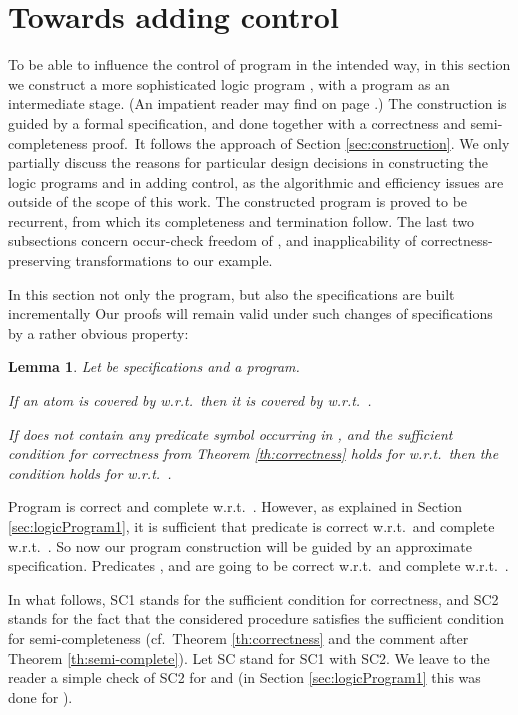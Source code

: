\documentclass{tlp}
\newtheorem{lemma}[theorem]{Lemma}
\begin{document}
\section{Towards adding control}
\label{sec:program}





To be able to influence the control of program  in the intended way,
in this section
we construct a more sophisticated logic program , with a program 
 as an intermediate stage.
(An impatient reader may find
 on page \pageref{final.program}.)
The construction is guided by a formal specification, and done together with
a correctness and semi-completeness proof.\
It follows the approach of Section \ref{sec:construction}.
We only partially discuss the reasons for particular design decisions in
constructing the logic programs
  and in adding control, as the algorithmic and efficiency
  issues are outside of the scope of this work.
The constructed program is proved to be recurrent, from which its
completeness and termination follow.
The last two subsections concern occur-check freedom of ,
and inapplicability of correctness-preserving transformations to our example. 




In this section not only the program, but also the specifications
are built incrementally
Our proofs will
remain valid under such changes of specifications by a rather obvious
property: 
\begin{lemma}
  Let  be specifications and  a program.

  If an atom  is covered by  w.r.t.\  then it is covered by
   w.r.t.~. 

  If  does not contain any predicate symbol occurring in
  , and
  the sufficient condition for correctness
  from Theorem \ref{th:correctness}
  holds for  w.r.t.\  
   then 
  the condition holds for  w.r.t.\ .
\end{lemma}






Program  is correct and complete w.r.t.\ .  However,
as explained in Section \ref{sec:logicProgram1}, 
   it is sufficient that predicate  
   is correct w.r.t.\  and complete w.r.t.\ .
So now our program construction will be guided by an approximate
specification.   
Predicates  , and  are going to be
correct w.r.t.\  and complete w.r.t.~.



In what follows, SC1 stands for the sufficient condition
for correctness,
and SC2 stands for the fact that the considered procedure satisfies the
sufficient condition for semi-completeness
(cf.\ Theorem \ref{th:correctness} and the comment after
Theorem \ref{th:semi-complete}).
Let SC stand for SC1 with SC2.
We leave to the reader a simple check of SC2 for 
and  (in Section \ref{sec:logicProgram1} this was done for  ).
\end{document}
